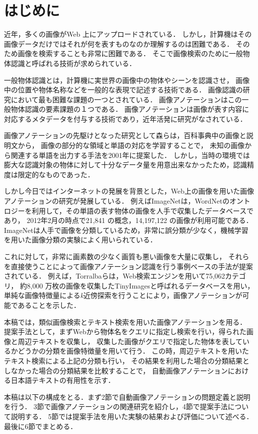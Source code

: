 \chapter{はじめに}
近年，多くの画像がWeb 上にアップロードされている．
しかし，計算機はその画像データだけではそれが何を表すものなのか理解するのは困難である．
そのため画像を検索することも非常に困難である．
そこで画像検索のために一般物体認識と呼ばれる技術が求められている\cite{yanai}．

一般物体認識とは，計算機に実世界の画像中の物体やシーンを認識させ，
画像中の位置や物体名称などを一般的な表現で記述する技術である．
画像認識の研究において最も困難な課題の一つとされている．
画像アノテーションはこの一般物体認識の要素課題の１つである．
画像アノテーションは画像が表す内容に対応するメタデータを付与する技術であり，近年活発に研究がなされている\cite{jeon,watanabe}．

画像アノテーションの先駆けとなった研究として森ら\cite{mori}は，百科事典中の画像と説明文から，
画像の部分的な領域と単語の対応を学習することで，
未知の画像から関連する単語を出力する手法を2001年に提案した．
しかし，当時の環境では膨大な認識対象の物体に対して十分なデータ量を用意出来なかったため，認識精度は限定的なものであった．

しかし今日ではインターネットの発展を背景とした，Web上の画像を用いた画像アノテーションの研究が発展している．
例えばImageNet\cite{imagenet}は，WordNetのオントロジーを利用して，その単語の表す物体の画像を人手で収集したデータベースであり，
2012年2月の時点で21,841 の概念，14,197,122 の画像が利用可能である．
ImageNetは人手で画像を分類しているため，非常に誤分類が少なく，機械学習を用いた画像分類の実験によく用いられている． 

これに対して，非常に画素数の少なく画質も悪い画像を大量に収集し，
それらを直接使うことによって画像アノテーション認識を行う事例ベースの手法が提案されている．
例えば，Torralba\cite{torralba}らは，Web検索エンジンを用いて75,062カテゴリ，
約8,000 万枚の画像を収集したTinyImagesと呼ばれるデータベースを用い，
単純な画像特徴量による{\it k}近傍探索を行うことにより，画像アノテーションが可能であることを示した．

本稿では，類似画像検索とテキスト検索を用いた画像アノテーションを用る．
提案手法として，まずWebから物体名をクエリに指定し検索を行い，得られた画像と周辺テキストを収集し，
収集した画像がクエリで指定した物体を表しているかどうかの分類を画像特徴量を用いて行う．
この時，周辺テキストを用いたテキスト検索による上記の分類も行い，
その結果を利用した場合の分類結果としなかった場合の分類結果を比較することで，
自動画像アノテーションにおける日本語テキストの有用性を示す．

本稿は以下の構成をとる．まず2節で自動画像アノテーションの問題定義と説明を行う．
3節で画像アノテーションの関連研究を紹介し，4節で提案手法について説明する．
5節では提案手法を用いた実験の結果および評価について述べる．最後に6節でまとめる．